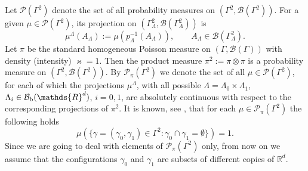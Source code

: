 \documentclass[reqno,11pt]{amsart}
\theoremstyle{definition}
\theoremstyle{remark}
\numberwithin{equation}{section}
\begin{document}
Let $\mathcal{P}(\Gamma^2)$ denote the set of all  probability
measures on $(\Gamma^2, \mathcal{B}(\Gamma^2))$. For a given $\mu\in
\mathcal{P}(\Gamma^2)$, its projection on $(\Gamma^2_\Lambda,
\mathcal{B} (\Gamma^2_\Lambda))$ is
\begin{equation}
 \label{5}
\mu^\Lambda (A_\Lambda) := \mu\left(p^{-1}_\Lambda (A_\Lambda)
\right), \qquad A_\Lambda \in \mathcal{B}(\Gamma^2_\Lambda).
\end{equation}
Let $\pi$ be the standard homogeneous Poisson measure on
$(\Gamma,\mathcal{B}(\Gamma))$ with density (intensity) $\varkappa
=1$. Then the product measure $\pi^2:=\pi\otimes \pi$ is a
probability measure on $(\Gamma^2, \mathcal{B}(\Gamma^2))$. By
$\mathcal{P}_\pi (\Gamma^2)$ we denote the set of all $\mu\in
\mathcal{P}(\Gamma^2)$, for each of which the projections
$\mu^\Lambda$, with all possible $\Lambda = \Lambda_0 \times
\Lambda_1$, $\Lambda_i \in \mathcal{B}_{\rm b} (\mathds{R}^d)$,
$i=0,1$, are absolutely continuous with respect to the corresponding
projections of $\pi^2$. It is known, see \cite[Proposition 3.1]{F},
that for each $\mu \in \mathcal{P}_\pi (\Gamma^2)$ the following
holds
\begin{equation*}
 
\mu\left(\{ \gamma=(\gamma_0, \gamma_1) \in \Gamma^2: \gamma_0 \cap
\gamma_1 = \emptyset\}\right) =1.
\end{equation*}
Since we are going to deal with elements of $\mathcal{P}_\pi
(\Gamma^2)$ only, from now on we assume that the configurations
$\gamma_0$ and $\gamma_1$ are subsets of different copies of
$\mathds{R}^d$.
\end{document}
